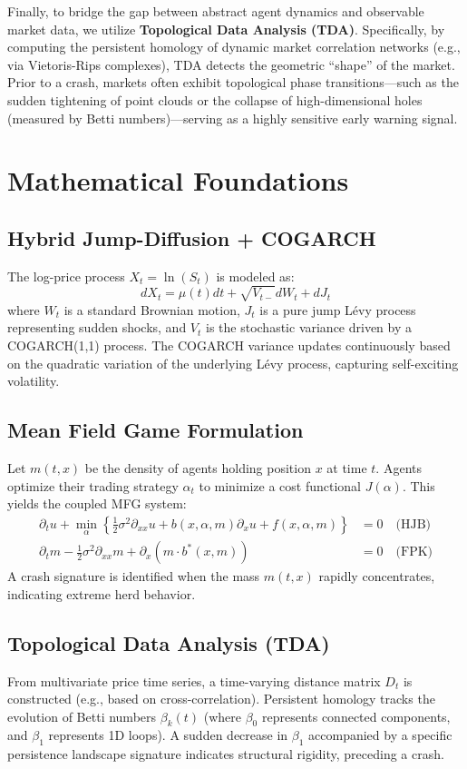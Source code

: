 \documentclass[11pt, a4paper]{article}
\begin{document}
Finally, to bridge the gap between abstract agent dynamics and observable market data, we utilize \textbf{Topological Data Analysis (TDA)}. Specifically, by computing the persistent homology of dynamic market correlation networks (e.g., via Vietoris-Rips complexes), TDA detects the geometric ``shape'' of the market. Prior to a crash, markets often exhibit topological phase transitions---such as the sudden tightening of point clouds or the collapse of high-dimensional holes (measured by Betti numbers)---serving as a highly sensitive early warning signal.

\section{Mathematical Foundations}

\subsection{Hybrid Jump-Diffusion + COGARCH}
The log-price process $X_t = \ln(S_t)$ is modeled as:
\begin{equation}
    dX_t = \mu(t) dt + \sqrt{V_{t-}} dW_t + dJ_t
\end{equation}
where $W_t$ is a standard Brownian motion, $J_t$ is a pure jump L\'evy process representing sudden shocks, and $V_t$ is the stochastic variance driven by a COGARCH(1,1) process. The COGARCH variance updates continuously based on the quadratic variation of the underlying L\'evy process, capturing self-exciting volatility.

\subsection{Mean Field Game Formulation}
Let $m(t,x)$ be the density of agents holding position $x$ at time $t$. Agents optimize their trading strategy $\alpha_t$ to minimize a cost functional $J(\alpha)$. This yields the coupled MFG system:
\begin{align}
    \partial_t u + \min_{\alpha} \left\{ \frac{1}{2}\sigma^2 \partial_{xx} u + b(x, \alpha, m)\partial_x u + f(x, \alpha, m) \right\} &= 0 \quad \text{(HJB)} \\
    \partial_t m - \frac{1}{2}\sigma^2 \partial_{xx} m + \partial_x (m \cdot b^*(x, m)) &= 0 \quad \text{(FPK)}
\end{align}
A crash signature is identified when the mass $m(t,x)$ rapidly concentrates, indicating extreme herd behavior.

\subsection{Topological Data Analysis (TDA)}
From multivariate price time series, a time-varying distance matrix $D_t$ is constructed (e.g., based on cross-correlation). Persistent homology tracks the evolution of Betti numbers $\beta_k(t)$ (where $\beta_0$ represents connected components, and $\beta_1$ represents 1D loops). A sudden decrease in $\beta_1$ accompanied by a specific persistence landscape signature indicates structural rigidity, preceding a crash.
\end{document}
